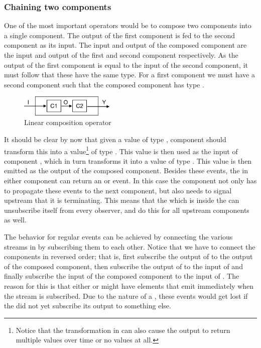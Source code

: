 \subsubsection{Chaining two components}
One of the most important operators would be to compose two components into a single component. The output of the first component is fed to the second component as its input. The input and output of the composed component are the input and output of the first and second component respectively. As the output of the first component is equal to the input of the second component, it must follow that these have the same type. For a first component  we must have a second component  such that the composed component  has type .

\begin{figure}[H]
	\begin{center}
		\includegraphics[width=0.4\textwidth]{figures/API-concat-operator.png}
	\end{center}
	\caption{Linear composition operator }
	\label{fig:concat-operator}
\end{figure}

It should be clear by now that given a value of type , component  should transform this into a value\footnote{Notice that the transformation in  can also cause the output to return multiple values over time or no values at all.} of type . This value is then used as the input of component , which in turn transforms it into a value of type . This value is then emitted as the output of the composed component. Besides these  events, the \obs in either component can return an  or  event. In this case the component not only has to propagate these events to the next component, but also needs to signal upstream that it is terminating. This means that the \subj which is inside the \comp can unsubscribe itself from every observer, and do this for all upstream components as well.

The behavior for regular  events can be achieved by connecting the various streams in  by subscribing them to each other. Notice that we have to connect the components in reversed order; that is, first subscribe the output of  to the output of the composed component, then subscribe the output of  to the input of  and finally subscribe the input of the composed component to the input of . The reason for this is that either  or  might have elements that emit immediately when the stream is subscribed. Due to the nature of a \subj, these events would get lost if the \comp did not yet subscribe its output to something else.

